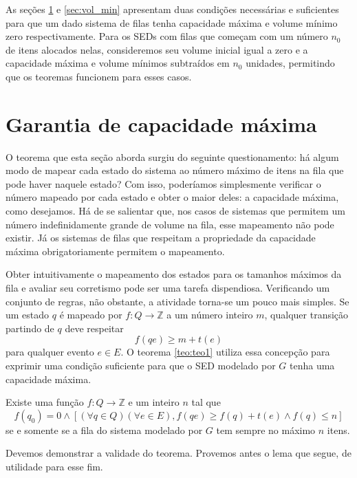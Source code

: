As seções \ref{sec:capac_max} e \ref{sec:vol_min} apresentam duas condições necessárias e suficientes para que um dado sistema de filas tenha capacidade máxima e volume mínimo zero respectivamente. Para os SEDs com filas que começam com um número $n_0$ de itens alocados nelas, consideremos seu volume inicial igual a zero e a capacidade máxima e volume mínimos subtraídos em $n_0$ unidades, permitindo que os teoremas funcionem para esses casos.

\section{Garantia de capacidade máxima}
\label{sec:capac_max}

O teorema que esta seção aborda surgiu do seguinte questionamento: há algum modo de mapear cada estado do sistema ao número máximo de itens na fila que pode haver naquele estado? Com isso, poderíamos simplesmente verificar o número mapeado por cada estado e obter o maior deles: a capacidade máxima, como desejamos. Há de se salientar que, nos casos de sistemas que permitem um número indefinidamente grande de volume na fila, esse mapeamento não pode existir. Já os sistemas de filas que respeitam a propriedade da capacidade máxima obrigatoriamente permitem o mapeamento.

Obter intuitivamente o mapeamento dos estados para os tamanhos máximos da fila e avaliar seu corretismo pode ser uma tarefa dispendiosa. Verificando um conjunto de regras, não obstante, a atividade torna-se um pouco mais simples. Se um estado $q$ é mapeado por $f : Q \to \mathbb{Z}$ a um número inteiro $m$, qualquer transição partindo de $q$ deve respeitar $$f(qe) \geq m + t(e)$$ para qualquer evento $e \in E$. O teorema \ref{teo:teo1} utiliza essa concepção para exprimir uma condição suficiente para que o SED modelado por $G$ tenha uma capacidade máxima.

\begin{teo}
	\label{teo:teo1}
	Existe uma função $f : Q \to \mathbb{Z}$ e um inteiro $n$ tal que \begin{equation*}
	f(q_0) = 0 \wedge [(\forall q \in Q)(\forall e \in E), f(qe) \geq f(q) + t(e) \wedge f(q) \leq n]
	\end{equation*} se e somente se a fila do sistema modelado por $G$ tem sempre no máximo $n$ itens.
\end{teo}

Devemos demonstrar a validade do teorema. Provemos antes o lema que segue, de utilidade para esse fim.

